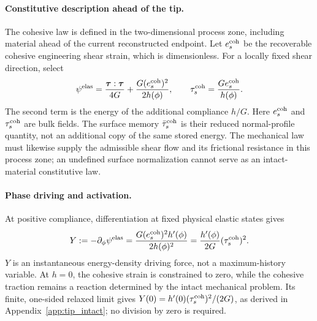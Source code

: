 \documentclass[10pt,a4paper]{article}
\begin{document}
\paragraph{Constitutive description ahead of the tip.}
The cohesive law is defined in the two-dimensional process zone, including
material ahead of the current reconstructed endpoint. Let
$e_s^{\rm coh}$ be the recoverable cohesive engineering shear strain,
which is dimensionless. For a locally fixed shear direction, select
\begin{equation}
 \psi^{\rm elas}
 =\frac{\bm\tau:\bm\tau}{4G}
    +\frac{G(e_s^{\rm coh})^2}{2h(\phi)},
 \qquad
 \tau_s^{\rm coh}=\frac{G e_s^{\rm coh}}{h(\phi)}.
 \label{eq:tip_bulk_storage}
\end{equation}
The second term is the energy of the additional compliance $h/G$.
Here $e_s^{\rm coh}$ and $\tau_s^{\rm coh}$ are bulk fields. The
surface memory $\bar\tau_s^{\rm coh}$ is their reduced normal-profile
quantity, not an additional copy of the same stored energy.
The mechanical law must likewise supply the admissible shear flow and its
frictional resistance in this process zone; an undefined surface normalization
cannot serve as an intact-material constitutive law.

\paragraph{Phase driving and activation.}
At positive compliance, differentiation at fixed physical elastic states gives
\begin{equation}
 Y:=-\partial_\phi\psi^{\rm elas}
   =\frac{G(e_s^{\rm coh})^2 h'(\phi)}{2h(\phi)^2}
   =\frac{h'(\phi)}{2G}(\tau_s^{\rm coh})^2.
 \label{eq:tip_driving}
\end{equation}
$Y$ is an instantaneous energy-density driving force, not a maximum-history
variable. At $h=0$, the cohesive strain is constrained to zero, while the
cohesive traction remains a reaction determined by the intact mechanical
problem. Its finite, one-sided relaxed limit gives
$Y(0)=h'(0)(\tau_s^{\rm coh})^2/(2G)$, as derived in
Appendix~\ref{app:tip_intact}; no division by zero is required.
\end{document}

